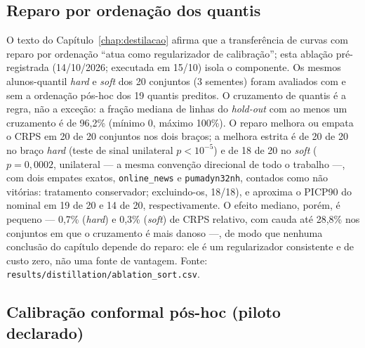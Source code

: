 \subsection{Reparo por ordenação dos quantis}
\label{sec:app-abl-sort}

O texto do Capítulo~\ref{chap:destilacao} afirma que a transferência
de curvas com reparo por ordenação ``atua como regularizador de
calibração''; esta ablação pré-registrada (14/10/2026; executada em 15/10) isola o
componente. Os mesmos alunos-quantil \emph{hard} e \emph{soft} dos 20
conjuntos (3 sementes) foram avaliados com e sem a ordenação pós-hoc
dos 19 quantis preditos. O cruzamento de quantis é a regra, não a
exceção: a fração mediana de linhas do \emph{hold-out} com ao menos um
cruzamento é de 96,2\% (mínimo 0, máximo 100\%). O reparo melhora ou
empata o CRPS em 20 de 20 conjuntos nos dois braços; a melhora
estrita é de 20 de 20 no braço \emph{hard} (teste de sinal
unilateral $p<10^{-5}$) e de 18 de 20 no \emph{soft} ($p=0{,}0002$,
unilateral --- a mesma convenção direcional de todo o trabalho ---,
com dois empates exatos, \texttt{online\_news} e
\texttt{pumadyn32nh}, contados como não vitórias: tratamento
conservador; excluindo-os, 18/18), e aproxima o
PICP90 do nominal em 19 de 20 e 14 de 20, respectivamente. O efeito
mediano, porém, é pequeno --- 0,7\% (\emph{hard}) e 0,3\% (\emph{soft})
de CRPS relativo, com cauda até 28,8\% nos conjuntos em que o
cruzamento é mais danoso ---, de modo que nenhuma conclusão do
capítulo depende do reparo: ele é um regularizador consistente e de
custo zero, não uma fonte de vantagem. Fonte:
\texttt{results/\allowbreak distillation/\allowbreak ablation\_\allowbreak sort.\allowbreak csv}.

\subsection{Calibração conformal pós-hoc (piloto declarado)}
\label{sec:app-pilot-conformal}

